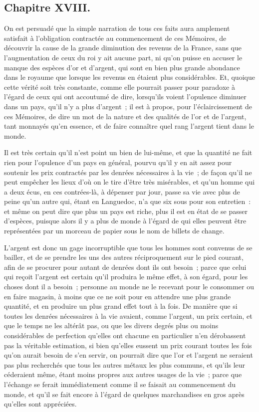 \documentclass[french,twoside]{book} %
\begin{document}
\subsection[{Chapitre XVIII.}]{Chapitre XVIII.}
\noindent On est persuadé que la simple narration de tous ces faits aura amplement satisfait à l’obligation contractée au commencement de ces Mémoires, de découvrir la cause de la grande diminution des revenus de la France, sans que l’augmentation de ceux du roi y ait aucune part, ni qu’on puisse en accuser le manque des espèces d’or et d’argent, qui sont en bien plus grande abondance dans le royaume que lorsque les revenus en étaient plus considérables. Et, quoique cette vérité soit très constante, comme elle pourrait passer pour paradoxe à l’égard de ceux qui ont accoutumé de dire, lorsqu’ils voient l’opulence diminuer dans un pays, qu’il n’y a plus d’argent ; il est à propos, pour l’éclaircissement de ces Mémoires, de dire un mot de la nature et des qualités de l’or et de l’argent, tant monnayés qu’en essence, et de faire connaître quel rang l’argent tient dans le monde.\par
Il est très certain qu’il n’est point un bien de lui-même, et que la quantité ne fait rien pour l’opulence d’un pays en général, pourvu qu’il y en ait assez pour soutenir les prix contractés par les denrées nécessaires à la vie ; de façon qu’il ne peut empêcher les lieux d’où on le tire d’être très misérables, et qu’un homme qui a deux écus, en ces contrées-là, à dépenser par jour, passe sa vie avec plus de peine qu’un autre qui, étant en Languedoc, n’a que six sous pour son entretien : et même on peut dire que plus un pays est riche, plus il est en état de se passer d’espèces, puisque alors il y a plus de monde à l’égard de qui elles peuvent être représentées par un morceau de papier sous le nom de billets de change.\par
L’argent est donc un gage incorruptible que tous les hommes sont convenus de se bailler, et de se prendre les uns des autres réciproquement sur le pied courant, afin de se procurer pour autant de denrées dont ils ont besoin ; parce que celui qui reçoit l’argent est certain qu’il produira le même effet, à son égard, pour les choses dont il a besoin ; personne au monde ne le recevant pour le consommer ou en faire magasin, à moins que ce ne soit pour en attendre une plus grande quantité, et en produire un plus grand effet tout à la fois. De manière que si toutes les denrées nécessaires à la vie avaient, comme l’argent, un prix certain, et que le temps ne les altérât pas, ou que les divers degrés plus ou moins considérables de perfection qu’elles ont chacune en particulier n’en dérobassent pas la véritable estimation, si bien qu’elles eussent un prix courant toutes les fois qu’on aurait besoin de s’en servir, on pourrait dire que l’or et l’argent ne seraient pas plus recherchés que tous les autres métaux les plus communs, et qu’ils leur céderaient même, étant moins propres aux autres usages de la vie ; parce que l’échange se ferait immédiatement comme il se faisait au commencement du monde, et qu’il se fait encore à l’égard de quelques marchandises en gros après qu’elles sont appréciées.\par
\end{document}
